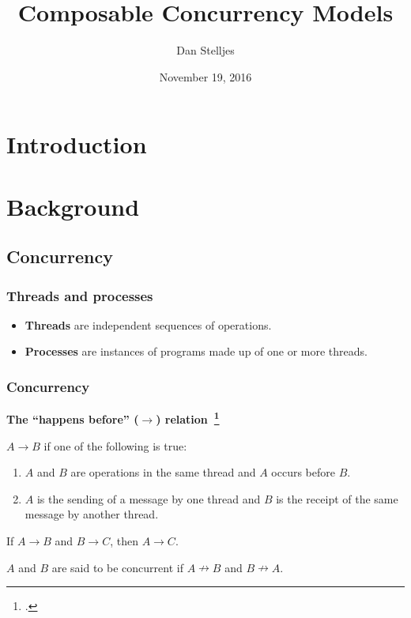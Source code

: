 \documentclass[aspectratio=1610]{beamer}
\title{Composable Concurrency Models}
\date{November 19, 2016}
\author{Dan Stelljes}
\begin{document}
  \maketitle

  \section*{Introduction}

  \begin{frame}
    \centering
    \resizebox{0.8\linewidth}{!}{}
  \end{frame}

  \begin{frame}
    \begin{multicols}{2}
      \tableofcontents
    \end{multicols}
  \end{frame}

  \section{Background}

  \subsection{Concurrency}

  \begin{frame}
    \frametitle{Threads and processes}

    \begin{figure}
      \centering
      
    \end{figure}

    \vfill

    \begin{itemize}
      \item \textbf{Threads} are independent sequences of operations.
      \item \textbf{Processes} are instances of programs made up of one or more threads.
    \end{itemize}
  \end{frame}

  \begin{frame}
    \frametitle{Concurrency}

    \textbf{The ``happens before'' ($\rightarrow$) relation~\footcite{Lamport1977}}

    $A \rightarrow B$ if one of the following is true:

    \begin{enumerate}
      \item $A$ and $B$ are operations in the same thread and $A$ occurs before $B$.
      \item $A$ is the sending of a message by one thread and $B$ is the receipt of the same message by another thread.
    \end{enumerate}

    If $A \rightarrow B$ and $B \rightarrow C$, then $A \rightarrow C$.

    $A$ and $B$ are said to be concurrent if $A \nrightarrow B$ and $B \nrightarrow A$.
  \end{frame}
\end{document}
